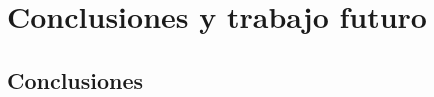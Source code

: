 \chapter{Conclusiones y trabajo futuro}
\label{cap:conclusiones}

%
%
%

\section{Conclusiones}
\label{sec:cumplimiento}

